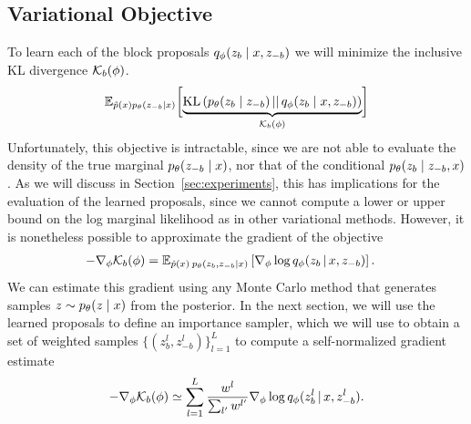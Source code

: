 \documentclass{article}
\theoremstyle{definition}
\begin{document}
\subsection{Variational Objective} 
To learn each of the block proposals $q_\phi(z_b \mid x, z_{-b})$ we will minimize the inclusive KL divergence $\mathcal{K}_b(\phi)$.
\begin{align*}
    \mathbb{E}_{\hat{p}(x)p_\theta(z_{-b} | x)}
    \biggl[
    \underbrace{
        \text{KL}\left(
            p_\theta(z_{b} \mid z_{-b})
            \,||\,
            q_\phi(z_{b} \mid x, z_{-b})
        \right)
    }_{\mathcal{K}_b(\phi)}
    \biggr]
\end{align*}
Unfortunately, this objective is intractable, since we are not able to evaluate the density of the true marginal $p_\theta(z_{-b} \mid x)$, nor that of the conditional $p_\theta(z_{b} \mid z_{-b}, x)$. 
As we will discuss in Section~\ref{sec:experiments}, this has implications for the evaluation of the learned proposals, since we cannot compute a lower or upper bound on the log marginal likelihood as in other variational methods. However, it is nonetheless possible to approximate the gradient of the objective 
\begin{align*}
    -\nabla_\phi \mathcal{K}_b(\phi)
    &=
    \mathbb{E}_{
    \hat{p}(x) \:
    p_\theta(z_{b}, z_{-b} | x)
    }
    \left[
    \nabla_\phi
    \log q_\phi(z_{b} \,|\, x, z_{-b})
    \right].
\end{align*}
We can estimate this gradient using any Monte Carlo method that generates samples $z \sim p_\theta(z \mid x)$ from the posterior. In the next section, we will use the learned proposals to define an importance sampler, which we will use to obtain a set of weighted samples $\{(z^l_b, z^l_{-b})\}_{l=1}^L$ to compute a self-normalized gradient estimate
\begin{align}
    \label{eq:grad-self-normalized}
    -\nabla_\phi \mathcal{K}_b(\phi)
    \simeq
    \sum_{l=1}^L
    \frac{w^l}{\sum_{l'} w^{l'}}
    \nabla_\phi
    \log q_\phi(z^l_{b} \,|\, x, z^l_{-b}).
\end{align}
\end{document}
